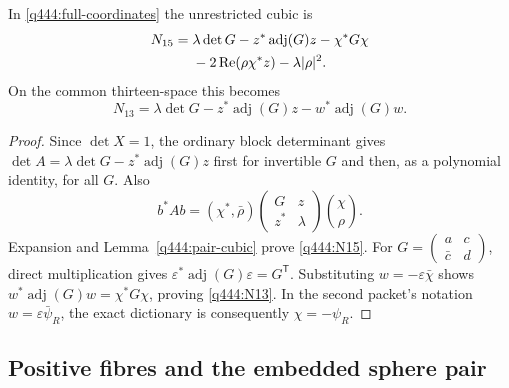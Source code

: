 \begin{proposition}\label{q444:cubics}
In \eqref{q444:full-coordinates} the unrestricted cubic is
\begin{align}\label{q444:N15}
 N_{15}={}&\lambda\det G-z^*\operatorname{adj}(G)z-\chi^*G\chi\notag\\
          &-2\operatorname{Re}(\rho\chi^*z)-\lambda|\rho|^2.
\end{align}
On the common thirteen-space this becomes
\begin{equation}\label{q444:N13}
 N_{13}=\lambda\det G-z^*\operatorname{adj}(G)z
                     -w^*\operatorname{adj}(G)w.
\end{equation}
\end{proposition}
\begin{proof}
Since $\det X=1$, the ordinary block determinant gives
$\det A=\lambda\det G-z^*\operatorname{adj}(G)z$ first for invertible
$G$ and then, as a polynomial identity, for all $G$. Also
\[
 b^*Ab=(\chi^*,\bar\rho)
       \begin{pmatrix}G&z\\z^*&\lambda\end{pmatrix}\binom{\chi}{\rho}.
\]
Expansion and Lemma~\ref{q444:pair-cubic} prove \eqref{q444:N15}.
For $G=\left(\begin{smallmatrix}a&c\\\bar c&d\end{smallmatrix}\right)$,
direct multiplication gives
$\varepsilon^*\operatorname{adj}(G)\varepsilon=G^{\mathsf T}$.
Substituting $w=-\varepsilon\bar\chi$ shows
$w^*\operatorname{adj}(G)w=\chi^*G\chi$, proving \eqref{q444:N13}.
In the second packet's notation $w=\varepsilon\bar\psi_R$, the exact
dictionary is consequently $\chi=-\psi_R$.
\end{proof}

\subsection{Positive fibres and the embedded sphere pair}

